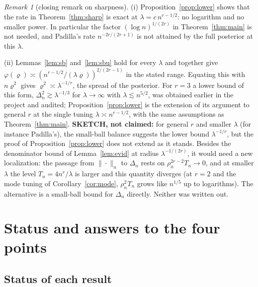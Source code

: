 \documentclass[11pt]{article}
\theoremstyle{definition}
\theoremstyle{remark}
\newtheorem{remark}{Remark}
\newcommand{\nn}[1]{\|#1\|_n}
\begin{document}
\begin{remark}[closing remark on sharpness]\label{rem:close}
(i) Proposition~\ref{prop:lower} shows that the rate in Theorem~\ref{thm:sharp} is exact at $\lambda=c\,n^{r-1/2}$: no logarithm and no smaller power. In particular the factor $(\log n)^{1/(2r)}$ in Theorem~\ref{thm:main} is not needed, and Padilla's rate $n^{-2r/(2r+1)}$ is not attained by the full posterior at this $\lambda$.

(ii) Lemmas~\ref{lem:sb} and~\ref{lem:sbu} hold for every $\lambda$ and together give $\varphi(\varrho)\asymp(n^{r-1/2}/(\lambda\varrho))^{2/(2r-1)}$ in the stated range. Equating this with $n\varrho^2$ gives $\varrho^2\asymp\lambda^{-1/r}$, the spread of the posterior. For $r=3$ a lower bound of this form, $\Delta_n^2\gtrsim\lambda^{-1/3}$ for $\lambda\to\infty$ with $\lambda\lesssim n^{5/2}$, was obtained earlier in the project and audited; Proposition~\ref{prop:lower} is the extension of its argument to general $r$ at the single tuning $\lambda\asymp n^{r-1/2}$, with the same assumptions as Theorem~\ref{thm:main}. \textbf{SKETCH, not claimed:} for general $r$ and smaller $\lambda$ (for instance Padilla's), the small-ball balance suggests the lower bound $\lambda^{-1/r}$, but the proof of Proposition~\ref{prop:lower} does not extend as it stands. Besides the denominator bound of Lemma~\ref{lem:evid} at radius $\lambda^{-1/(2r)}$, it would need a new localization: the passage from $\nn{\cdot}$ to $\Delta_n$ rests on $\rho_n^{2r-2}T_n\to0$, and at smaller $\lambda$ the level $T_n=4n^r/\lambda$ is larger and this quantity diverges (at $r=2$ and the mode tuning of Corollary~\ref{cor:mode}, $\rho_n^2T_n$ grows like $n^{1/5}$ up to logarithms). The alternative is a small-ball bound for $\Delta_n$ directly. Neither was written out.
\end{remark}

\section{Status and answers to the four points}\label{sec:answers}

\subsection{Status of each result}
\end{document}
